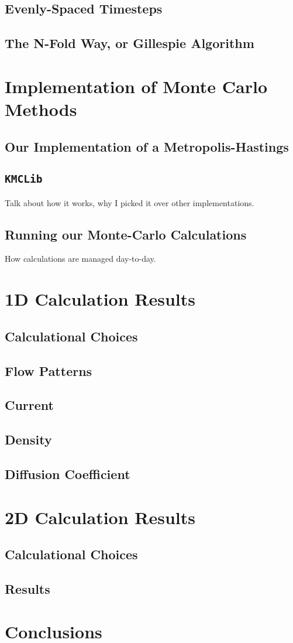 \subsection{Evenly-Spaced Timesteps}
\subsection{The N-Fold Way, or Gillespie Algorithm}
\section{Implementation of Monte Carlo Methods}
\subsection{Our Implementation of a Metropolis-Hastings}
\subsection{\texttt{KMCLib}}
Talk about how it works, why I picked it over other implementations.
\subsection{Running our Monte-Carlo Calculations}
How calculations are managed day-to-day.

\section{1D Calculation Results}
\subsection{Calculational Choices}
\subsection{Flow Patterns}
\subsection{Current}
\subsection{Density}
\subsection{Diffusion Coefficient}

\section{2D Calculation Results}
\subsection{Calculational Choices}
\subsection{Results}

\section{Conclusions}
